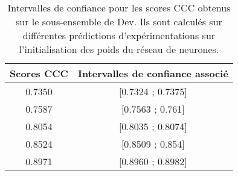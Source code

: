\begin{table}
    \centering
    \begin{tabular}{|c|c|}
    \hline
         \textbf{Scores CCC} &\textbf{Intervalles de confiance associé} \\
         \hline
         0.7350	& [0.7324 ; 0.7375] \\
         0.7587	& [0.7563 ; 0.761] \\
         0.8054	& [0.8035 ; 0.8074] \\
         0.8524	& [0.8509 ; 0.854] \\
         0.8971	& [0.8960 ; 0.8982] \\
         \hline
    \end{tabular}
    \caption{Intervalles de confiance pour les scores CCC obtenus sur le sous-ensemble de Dev. Ils sont calculés sur différentes prédictions d'expérimentations sur l'initialisation des poids du réseau de neurones.}
    \label{tab:inter_conf}
\end{table}
